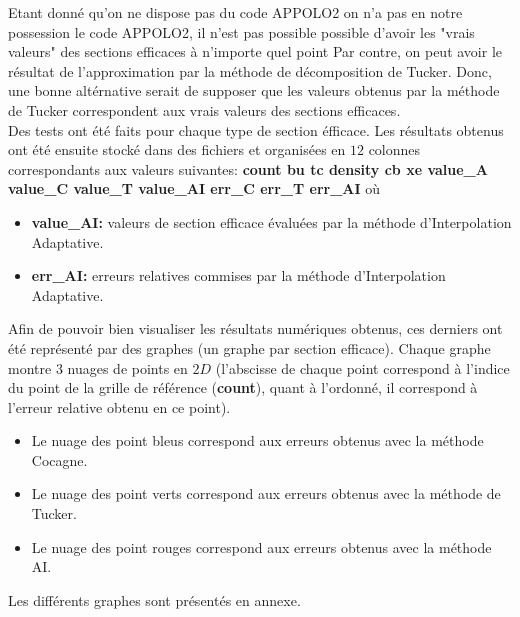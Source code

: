 Etant donné qu'on ne dispose pas du code APPOLO2 on n'a pas en notre possession le code APPOLO2, il n'est pas possible possible d'avoir les "vrais valeurs" des sections efficaces à n'importe quel point
Par contre, on peut avoir le résultat de l'approximation par la méthode de décomposition de Tucker.
Donc, une bonne altérnative serait de supposer que les valeurs obtenus par la méthode de Tucker correspondent aux vrais valeurs des sections efficaces.\\

Des tests ont été faits pour chaque type de section éfficace. Les résultats obtenus ont été ensuite stocké dans des fichiers et organisées en $12$ colonnes correspondants aux
valeurs suivantes: \textbf{count bu tc density cb xe value\_A value\_C value\_T value\_AI err\_C err\_T err\_AI} où
\begin{itemize}
\item \textbf{value\_AI:} valeurs de section efficace évaluées par la méthode d'Interpolation Adaptative.
\item \textbf{err\_AI:} erreurs relatives commises par la méthode d'Interpolation Adaptative.
\end{itemize}

Afin de pouvoir bien visualiser les résultats numériques obtenus, ces derniers ont été représenté par des graphes (un graphe par section efficace).
Chaque graphe montre $3$ nuages de points en $2D$ (l'abscisse de chaque point correspond à l'indice du point de la grille de référence (\textbf{count}),
quant à l'ordonné, il correspond à l'erreur relative obtenu en ce point).
\begin{itemize}
\item Le nuage des point bleus correspond aux erreurs obtenus avec la méthode Cocagne.
\item Le nuage des point verts correspond aux erreurs obtenus avec la méthode de Tucker.
\item Le nuage des point rouges correspond aux erreurs obtenus avec la méthode AI.
\end{itemize}
Les différents graphes sont présentés en annexe.\\

